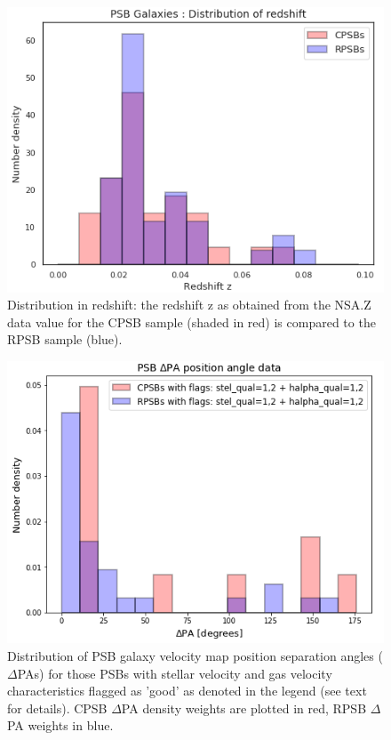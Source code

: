 \begin{figure}
    \centering
    \includegraphics[width=\columnwidth]{images/JupyterPlots/Dist-z-All.png}
    \caption[PSB distribution in redshift]{Distribution in redshift: the redshift z as obtained from the NSA.Z data value for the CPSB sample (shaded in red) is compared to the RPSB sample (blue).}
    \label{fig:redshift-plot}
\end{figure}

\begin{figure}
    \centering
    \includegraphics[width=\columnwidth]{images/JupyterPlots/Dist-Delta-PA-All-GoodFlags.png}
    \caption[Distribution of PSB stellar and gas velocity field position angles]{Distribution of PSB galaxy velocity map position separation angles ($\Delta$PAs) for those PSBs with stellar velocity and gas velocity characteristics flagged as 'good' as denoted in the legend (see text for details). CPSB $\Delta$PA density weights are plotted in red, RPSB $\Delta$PA weights in blue.}
    \label{fig:deltaPAdistribution}
\end{figure}

